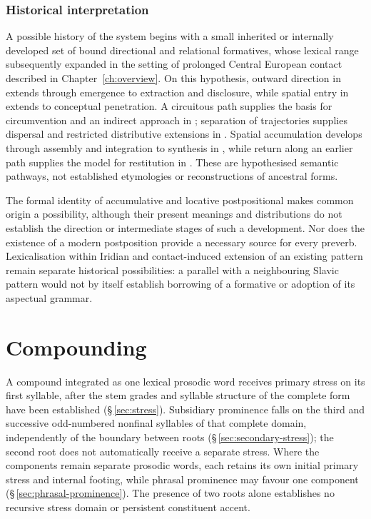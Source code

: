 \subsubsection{Historical interpretation}

A possible history of the system begins with a small inherited or internally
developed set of bound directional and relational formatives, whose lexical
range subsequently expanded in the setting of prolonged Central European
contact described in Chapter~\ref{ch:overview}. On this hypothesis, outward
direction in  extends through emergence to extraction and disclosure,
while spatial entry in  extends to conceptual penetration.
A circuitous path supplies the basis for circumvention and an indirect approach
in ; separation of trajectories supplies dispersal and restricted
distributive extensions in . Spatial accumulation develops through
assembly and integration to synthesis in , while return along an
earlier path supplies the model for restitution in . These are
hypothesised semantic pathways, not established etymologies or reconstructions
of ancestral forms.

The formal identity of accumulative  and locative postpositional
 makes common origin a possibility, although their present meanings
and distributions do not establish the direction or intermediate stages of such
a development. Nor does the existence of a modern postposition provide a
necessary source for every preverb. Lexicalisation within Iridian and
contact-induced extension of an existing pattern remain separate historical
possibilities: a parallel with a neighbouring Slavic pattern would not by itself
establish borrowing of a formative or adoption of its aspectual grammar.

\section{Compounding}\label{sec:compound-prosody}

A compound integrated as one lexical prosodic word receives primary stress on
its first syllable, after the stem grades and syllable structure of the complete
form have been established (§\,\ref{sec:stress}). Subsidiary prominence
falls on the third and successive odd-numbered nonfinal syllables of that
complete domain, independently of the boundary between roots
(§\,\ref{sec:secondary-stress}); the second root does not automatically
receive a separate stress. Where the components remain separate prosodic
words, each retains its own initial primary stress and internal footing,
while phrasal prominence may favour one component
(§\,\ref{sec:phrasal-prominence}). The presence of two roots alone
establishes no recursive stress domain or persistent constituent accent.


